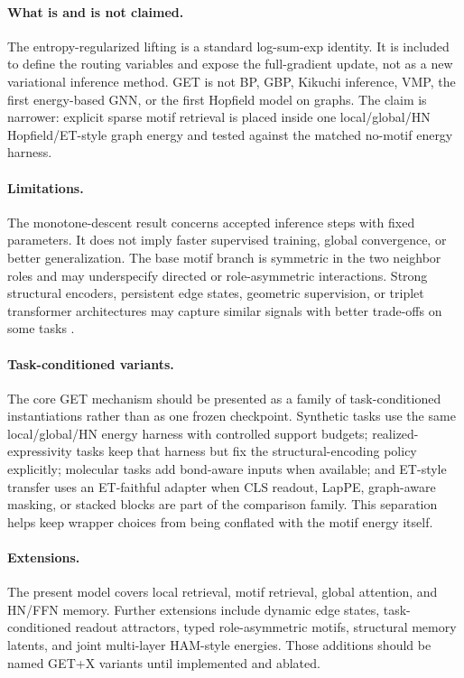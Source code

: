 \documentclass[11pt,a4paper]{article}
\begin{document}
\paragraph{What is and is not claimed.}
The entropy-regularized lifting is a standard log-sum-exp identity. It is
included to define the routing variables and expose the full-gradient update,
not as a new variational inference method. GET is not BP, GBP, Kikuchi
inference, VMP, the first energy-based GNN, or the first Hopfield model on
graphs. The claim is narrower: explicit sparse motif retrieval is placed inside
one local/global/HN Hopfield/ET-style graph energy and tested against the
matched no-motif energy harness.

\paragraph{Limitations.}
The monotone-descent result concerns accepted inference steps with fixed
parameters. It does not imply faster supervised training, global convergence,
or better generalization. The base motif branch is symmetric in the two neighbor
roles and may underspecify directed or role-asymmetric interactions. Strong
structural encoders, persistent edge states, geometric supervision, or triplet
transformer architectures may capture similar signals with better trade-offs on
some tasks \citep{ying2021graphormer,rampasek2022gps,ma2023grit,
shirzad2023exphormer,canturk2024gpse,airale2025spse,diao2023relational,
hussain2024triplet}.

\paragraph{Task-conditioned variants.}
The core GET mechanism should be presented as a family of task-conditioned
instantiations rather than as one frozen checkpoint. Synthetic tasks use the
same local/global/HN energy harness with controlled support budgets;
realized-expressivity tasks keep that harness but fix the structural-encoding
policy explicitly; molecular tasks add bond-aware inputs when available; and
ET-style transfer uses an ET-faithful adapter when CLS readout, LapPE,
graph-aware masking, or stacked blocks are part of the comparison family. This
separation helps keep wrapper choices from being conflated with the motif
energy itself.

\paragraph{Extensions.}
The present model covers local retrieval, motif retrieval, global attention,
and HN/FFN memory. Further extensions include dynamic edge states,
task-conditioned readout attractors, typed role-asymmetric motifs, structural
memory latents, and joint multi-layer HAM-style energies. Those additions
should be named GET+X variants until implemented and ablated.
\end{document}
